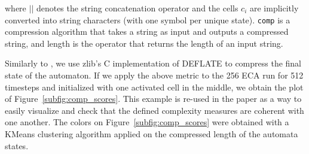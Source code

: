 where $||$ denotes the string concatenation operator and the cells $c_i$ are
implicitly converted into string characters (with one symbol per unique state).
\texttt{comp} is a compression algorithm that takes a string as input and
outputs a compressed string, and length is the operator that returns the length
of an input string.

Similarly to \parencite{kowaliwMeasuresComplexityArtificial2008,
  zenilCompressionBasedInvestigationDynamical2010}, we use zlib’s C
implementation of DEFLATE to compress the final state of the automaton. If we
apply the above metric to the 256 ECA run for 512 timesteps and initialized with
one activated cell in the middle, we obtain the plot of
Figure~\ref{subfig:comp_scores}. This example is re-used in the paper as a way
to easily visualize and check that the defined complexity measures are coherent
with one another. The colors on Figure~\ref{subfig:comp_scores} were obtained
with a KMeans clustering algorithm applied on the compressed length of the
automata states.

